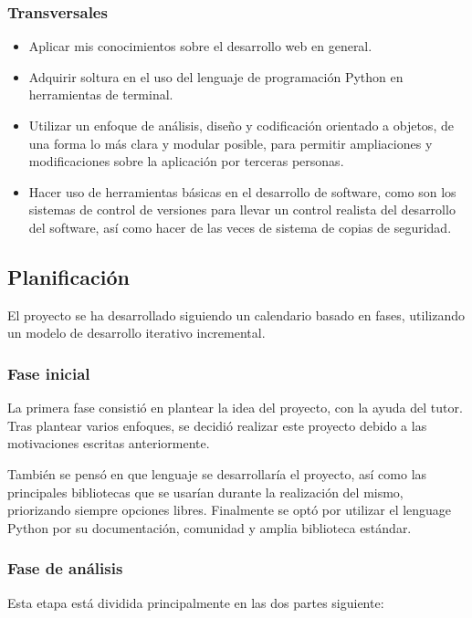 \documentclass[a4paper,12pt]{article}
\begin{document}
\subsubsection{Transversales}
\begin{itemize}
\item Aplicar mis conocimientos sobre el desarrollo web en general.
\item Adquirir soltura en el uso del lenguaje de programación Python en herramientas de terminal.
\item Utilizar un enfoque de análisis, diseño y codificación orientado a objetos,
de una forma lo más clara y modular posible, para permitir ampliaciones y
modificaciones sobre la aplicación por terceras personas.
\item Hacer uso de herramientas básicas en el desarrollo de software, como son los
sistemas de control de versiones para llevar un control realista del desarrollo
del software, así como hacer de las veces de sistema de copias de seguridad.
\end{itemize}

\subsection{Planificación}

El proyecto se ha desarrollado siguiendo un calendario basado en fases, utilizando un modelo
de desarrollo iterativo incremental.

\subsubsection{Fase inicial}

La primera fase consistió en plantear la idea del proyecto, con la ayuda del tutor. Tras plantear
varios enfoques, se decidió realizar este proyecto debido a las motivaciones escritas anteriormente.

También se pensó en que lenguaje se desarrollaría el proyecto, así como las principales bibliotecas que
se usarían durante la realización del mismo, priorizando siempre opciones libres. Finalmente se optó por
utilizar el lenguage Python por su documentación, comunidad y amplia biblioteca estándar.

\subsubsection{Fase de análisis}

Esta etapa está dividida principalmente en las dos partes siguiente:
\end{document}
